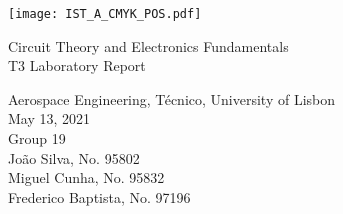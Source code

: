 
\thispagestyle {empty}

\texttt{[image: IST\_A\_CMYK\_POS.pdf]}

\begin{center}
%
\vspace{1.0cm}

\vspace{1cm}
{\FontLb Circuit Theory and Electronics Fundamentals} \\ %
\vspace{3cm}
{\FontSn T3 Laboratory Report} %
\vspace{3cm}
\par
{\FontSn Aerospace Engineering, Técnico, University of Lisbon} \\
\vspace{1cm}
{\FontSn May 13, 2021}\\ %
%
\vspace{1.5cm}
{\FontLb Group 19} \\
\vspace{1cm}
{\FontSn João Silva, No. 95802} \\
{\FontSn Miguel Cunha, No. 95832} \\
{\FontSn Frederico Baptista, No. 97196} \\
\end{center}
